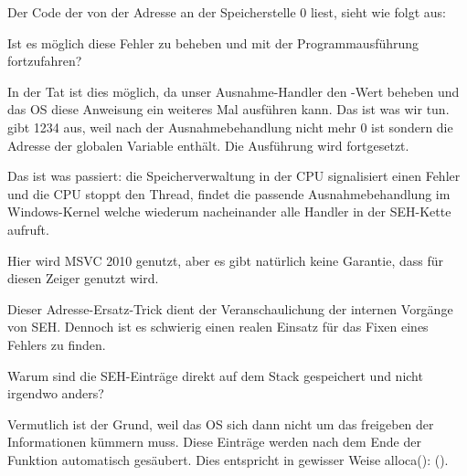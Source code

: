 Der Code der von der Adresse an der Speicherstelle 0 liest, sieht wie folgt aus:



Ist es möglich diese Fehler  zu beheben und mit der Programmausführung
fortzufahren?

In der Tat ist dies möglich, da unser Ausnahme-Handler den \EAX-Wert beheben und das
\ac{OS} diese Anweisung ein weiteres Mal ausführen kann.
Das ist was wir tun. \printf gibt 1234 aus, weil \EAX nach der Ausnahmebehandlung nicht
mehr 0 ist sondern die Adresse der globalen Variable  enthält.
Die Ausführung wird fortgesetzt.

Das ist was passiert: die Speicherverwaltung in der \ac{CPU} signalisiert einen Fehler und
die \ac{CPU} stoppt den Thread, findet die passende Ausnahmebehandlung im Windows-Kernel
welche wiederum nacheinander alle Handler in der \ac{SEH}-Kette aufruft.

Hier wird MSVC 2010 genutzt, aber es gibt natürlich keine Garantie, dass \EAX für diesen
Zeiger genutzt wird.

Dieser Adresse-Ersatz-Trick dient der Veranschaulichung der internen Vorgänge von \ac{SEH}.
Dennoch ist es schwierig einen realen Einsatz für das Fixen eines Fehlers 
zu finden.

Warum sind die SEH-Einträge direkt auf dem Stack gespeichert und nicht irgendwo anders?

Vermutlich ist der Grund, weil das \ac{OS} sich dann nicht um das freigeben der Informationen
kümmern muss. Diese Einträge werden nach dem Ende der Funktion automatisch gesäubert.
Dies entspricht in gewisser Weise alloca(): ().
